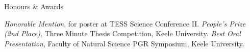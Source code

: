 \begin{rubric}{Honours \& Awards}

\entry*[2021]
    \textit{Honorable Mention}, for poster at TESS Science Conference II.
\entry*[2021]
    \textit{People's Prize (2nd Place)}, Three Minute Thesis Competition, Keele University.
\entry*[2021]
    \textit{Best Oral Presentation}, Faculty of Natural Science PGR Symposium, Keele University. 

\end{rubric}